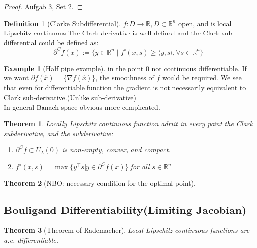 \documentclass[a4paper,11pt,fleqn, draft]{book}
\newtheorem{theorem}{Theorem}[section]
\theoremstyle{definition}
\newtheorem{definition}{Definition}[section]
\newtheorem*{example}{Example}
\theoremstyle{remark}
\begin{document}
\begin{proof}
	Aufgab 3, Set 2.
\end{proof}


\begin{definition}[Clarke Subdifferential]
	$f: D \longrightarrow \mathbb{R}, D \subset \mathbb{R}^n$ open, and is local Lipschitz continuous.The Clark derivative is well defined and the Clark sub-differential could be defined as:
	\begin{equation*}
		\partial^C f(x) := \{ y \in \mathbb{R}^n \mid f^\circ(x,s) \geq \langle y,s \rangle , \forall s \in \mathbb{R}^n \}
	\end{equation*}
\end{definition}
\begin{example}[Half pipe example]
	in the point 0 not continuous differentiable. If we want $\partial f(\hat{x}) = \{\nabla f(\hat{x}) \}$, the smoothness of $f$ would be required. We see that even for differentiable function the gradient is not necessarily equivalent to Clark sub-derivative.(Unlike sub-derivative)\\
	In general Banach space obvious more complicated. 
\end{example}

\begin{theorem}
	Locally Lipschitz continuous function admit in every point the Clark subderivative, and the subderivative:
	\begin{enumerate}
		\item $\partial^C f \subset U_L(0)$ is non-empty, convex, and compact.
		\item $f^\circ(x, s) = \max\{y^\top s | y \in \partial^C f(x) \}$ for all $s \in \mathbb{R}^n$
	\end{enumerate}
\end{theorem}

\begin{theorem}[NBO: necessary condition for the optimal point]
	
\end{theorem}



\subsection{Bouligand Differentiability(Limiting Jacobian)}

\begin{theorem}[Theorem of Rademacher]
Local Lipschitz continuous functions are a.e. differentiable.
\end{theorem}
\end{document}
